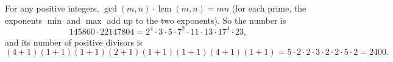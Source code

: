 For any positive integers, $\gcd(m,n)\cdot\operatorname{lcm}(m,n)=mn$ (for each prime, the exponents $\min$ and $\max$ add up to the two exponents). So the number is
\[
145860\cdot22147804=2^4\cdot3\cdot5\cdot7^2\cdot11\cdot13\cdot17^4\cdot23 ,
\]
and its number of positive divisors is
\[
(4+1)(1+1)(1+1)(2+1)(1+1)(1+1)(4+1)(1+1)=5\cdot2\cdot2\cdot3\cdot2\cdot2\cdot5\cdot2=\boxed{2400}.
\]
